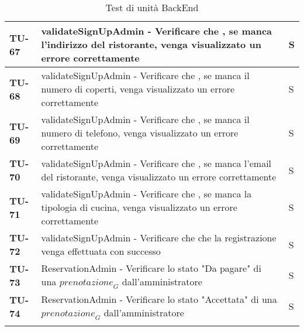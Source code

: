 \begin{longtable}{|>{\centering\arraybackslash}p{1.5cm}|p{15cm}|p{1cm}|}
  \hline
  \rowcolor{gray!10}
  \textbf{TU-67} & validateSignUpAdmin - Verificare che , se manca l'indirizzo del ristorante, venga visualizzato un errore correttamente  & S \\
  \hline
  \rowcolor{gray!10}
  \textbf{TU-68} & validateSignUpAdmin - Verificare che , se manca il numero di coperti, venga visualizzato un errore correttamente  & S \\
  \hline
  \rowcolor{gray!10}
  \textbf{TU-69} & validateSignUpAdmin - Verificare che , se manca il numero di telefono, venga visualizzato un errore correttamente  & S \\
  \hline
  \rowcolor{gray!10}
  \textbf{TU-70} & validateSignUpAdmin - Verificare che , se manca l'email del ristorante, venga visualizzato un errore correttamente  & S \\
  \hline
  \rowcolor{gray!10}
  \textbf{TU-71} & validateSignUpAdmin - Verificare che , se manca la tipologia di cucina, venga visualizzato un errore correttamente  & S \\
  \hline
  \rowcolor{gray!10}
  \textbf{TU-72} & validateSignUpAdmin - Verificare che che la registrazione venga effettuata con successo  & S \\
  \hline
  \rowcolor{gray!10}
  \textbf{TU-73} & ReservationAdmin - Verificare lo stato "Da pagare" di una $\textit{prenotazione}_G$ dall'amministratore & S \\
  \hline
  \rowcolor{gray!10}
  \textbf{TU-74} & ReservationAdmin - Verificare lo stato "Accettata" di una $\textit{prenotazione}_G$ dall'amministratore & S \\
  \hline
\caption{Test di unità BackEnd} 
\label{tab:test_unita}
\end{longtable}


